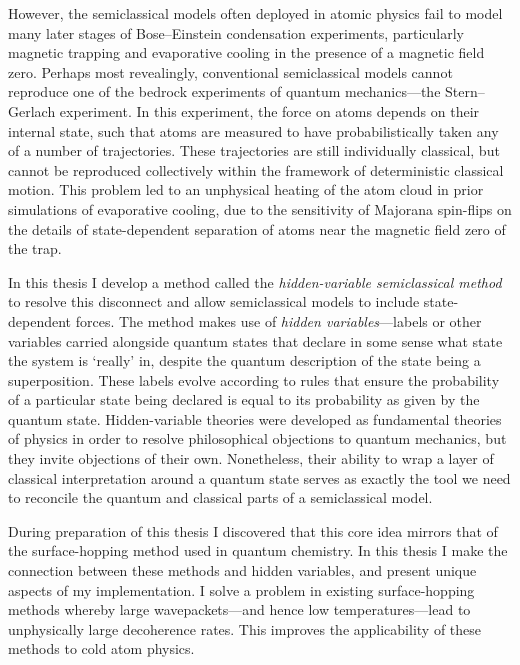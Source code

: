 However, the semiclassical models often deployed in atomic physics fail to model many later stages of Bose--Einstein condensation experiments, particularly magnetic trapping and evaporative cooling in the presence of a magnetic field zero. Perhaps most revealingly, conventional semiclassical models cannot reproduce one of the bedrock experiments of quantum mechanics---the Stern--Gerlach experiment. In this experiment, the force on atoms depends on their internal state, such that atoms are measured to have probabilistically taken any of a number of trajectories. These trajectories are still individually classical, but cannot be reproduced collectively within the framework of deterministic classical motion. This problem led to an unphysical heating of the atom cloud in prior simulations of evaporative cooling, due to the sensitivity of Majorana spin-flips on the details of state-dependent separation of atoms near the magnetic field zero of the trap.

In this thesis I develop a method called the \emph{hidden-variable semiclassical method} to resolve this disconnect and allow semiclassical models to include state-dependent forces. The method makes use of \emph{hidden variables}---labels or other variables carried alongside quantum states that declare in some sense what state the system is `really' in, despite the quantum description of the state being a superposition. These labels evolve according to rules that ensure the probability of a particular state being declared is equal to its probability as given by the quantum state. Hidden-variable theories were developed as fundamental theories of physics in order to resolve philosophical objections to quantum mechanics, but they invite objections of their own. Nonetheless, their ability to wrap a layer of classical interpretation around a quantum state serves as exactly the tool we need to reconcile the quantum and classical parts of a semiclassical model.

During preparation of this thesis I discovered that this core idea mirrors that of the surface-hopping method used in quantum chemistry. In this thesis I make the connection between these methods and hidden variables, and present unique aspects of my implementation. I solve a problem in existing surface-hopping methods whereby large wavepackets---and hence low temperatures---lead to unphysically large decoherence rates. This improves the applicability of these methods to cold atom physics.


